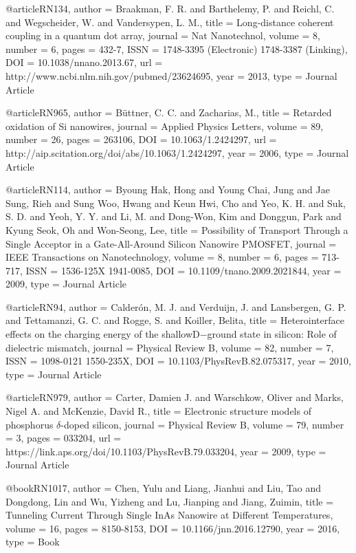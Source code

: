 @article{RN134,
   author = {Braakman, F. R. and Barthelemy, P. and Reichl, C. and Wegscheider, W. and Vandersypen, L. M.},
   title = {Long-distance coherent coupling in a quantum dot array},
   journal = {Nat Nanotechnol},
   volume = {8},
   number = {6},
   pages = {432-7},
   ISSN = {1748-3395 (Electronic)
1748-3387 (Linking)},
   DOI = {10.1038/nnano.2013.67},
   url = {http://www.ncbi.nlm.nih.gov/pubmed/23624695},
   year = {2013},
   type = {Journal Article}
}

@article{RN965,
   author = {Büttner, C. C. and Zacharias, M.},
   title = {Retarded oxidation of Si nanowires},
   journal = {Applied Physics Letters},
   volume = {89},
   number = {26},
   pages = {263106},
   DOI = {10.1063/1.2424297},
   url = {http://aip.scitation.org/doi/abs/10.1063/1.2424297},
   year = {2006},
   type = {Journal Article}
}

@article{RN114,
   author = {Byoung Hak, Hong and Young Chai, Jung and Jae Sung, Rieh and Sung Woo, Hwang and Keun Hwi, Cho and Yeo, K. H. and Suk, S. D. and Yeoh, Y. Y. and Li, M. and Dong-Won, Kim and Donggun, Park and Kyung Seok, Oh and Won-Seong, Lee},
   title = {Possibility of Transport Through a Single Acceptor in a Gate-All-Around Silicon Nanowire PMOSFET},
   journal = {IEEE Transactions on Nanotechnology},
   volume = {8},
   number = {6},
   pages = {713-717},
   ISSN = {1536-125X
1941-0085},
   DOI = {10.1109/tnano.2009.2021844},
   year = {2009},
   type = {Journal Article}
}

@article{RN94,
   author = {Calderón, M. J. and Verduijn, J. and Lansbergen, G. P. and Tettamanzi, G. C. and Rogge, S. and Koiller, Belita},
   title = {Heterointerface effects on the charging energy of the shallowD−ground state in silicon: Role of dielectric mismatch},
   journal = {Physical Review B},
   volume = {82},
   number = {7},
   ISSN = {1098-0121
1550-235X},
   DOI = {10.1103/PhysRevB.82.075317},
   year = {2010},
   type = {Journal Article}
}

@article{RN979,
   author = {Carter, Damien J. and Warschkow, Oliver and Marks, Nigel A. and McKenzie, David R.},
   title = {Electronic structure models of phosphorus $\ensuremath{\delta}$-doped silicon},
   journal = {Physical Review B},
   volume = {79},
   number = {3},
   pages = {033204},
   url = {https://link.aps.org/doi/10.1103/PhysRevB.79.033204},
   year = {2009},
   type = {Journal Article}
}

@book{RN1017,
   author = {Chen, Yulu and Liang, Jianhui and Liu, Tao and Dongdong, Lin and Wu, Yizheng and Lu, Jianping and Jiang, Zuimin},
   title = {Tunneling Current Through Single InAs Nanowire at Different Temperatures},
   volume = {16},
   pages = {8150-8153},
   DOI = {10.1166/jnn.2016.12790},
   year = {2016},
   type = {Book}
}

